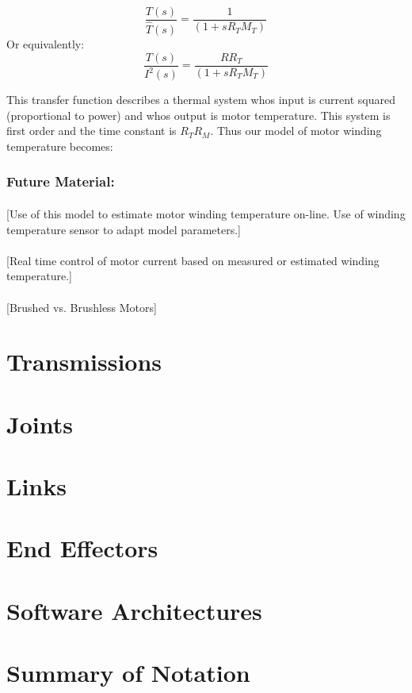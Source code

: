 \[
\frac{T(s)}{\hat{T}(s)} = \frac{1}{(1+sR_TM_T)}
\]
Or equivalently:
\[
\frac{T(s)}{I^2(s)} = \frac{RR_T}{(1+sR_TM_T)}
\]

This transfer function describes a thermal system whos input
is current squared (proportional to power) and whos output is
motor temperature.  This system is first order and the time
constant is $R_TR_M$.   Thus our model of motor winding temperature
becomes:

\begin{center}
\end{center}

\subsubsection*{Future Material:}

\paragraph{}

[Use of this model to estimate motor winding temperature on-line.
Use of winding temperature sensor to adapt model parameters.]

\paragraph{}

[Real time control of motor current based on measured or estimated
winding temperature.]


\paragraph{}

[Brushed vs. Brushless Motors]








\section{Transmissions}
\section{Joints}
\section{Links}
\section{End Effectors}
\section{Software Architectures}


\section{Summary of Notation}


